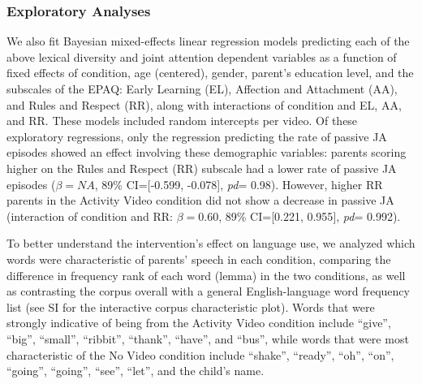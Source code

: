 \documentclass[man,floatsintext]{apa6}
\begin{document}
\hypertarget{exploratory-analyses}{%
\subsubsection{Exploratory Analyses}\label{exploratory-analyses}}

We also fit Bayesian mixed-effects linear regression models predicting each of the above lexical diversity and joint attention dependent variables as a function of fixed effects of condition, age (centered), gender, parent's education level, and the subscales of the EPAQ: Early Learning (EL), Affection and Attachment (AA), and Rules and Respect (RR), along with interactions of condition and EL, AA, and RR.
These models included random intercepts per video.
Of these exploratory regressions, only the regression predicting the rate of passive JA episodes showed an effect involving these demographic variables: parents scoring higher on the Rules and Respect (RR) subscale had a lower rate of passive JA episodes (\(\beta=NA\), 89\% CI={[}-0.599, -0.078{]}, \emph{pd}= 0.98).
However, higher RR parents in the Activity Video condition did not show a decrease in passive JA (interaction of condition and RR: \(\beta=0.60\), 89\% CI={[}0.221, 0.955{]}, \emph{pd}= 0.992).

To better understand the intervention's effect on language use, we analyzed which words were characteristic of parents' speech in each condition, comparing the difference in frequency rank of each word (lemma) in the two conditions, as well as contrasting the corpus overall with a general English-language word frequency list (see SI for the interactive corpus characteristic plot).
Words that were strongly indicative of being from the Activity Video condition include \enquote{give}, \enquote{big}, \enquote{small}, \enquote{ribbit}, \enquote{thank}, \enquote{have}, and \enquote{bus}, while words that were most characteristic of the No Video condition include \enquote{shake}, \enquote{ready}, \enquote{oh}, \enquote{on}, \enquote{going}, \enquote{going}, \enquote{see}, \enquote{let}, and the child's name.
\end{document}
